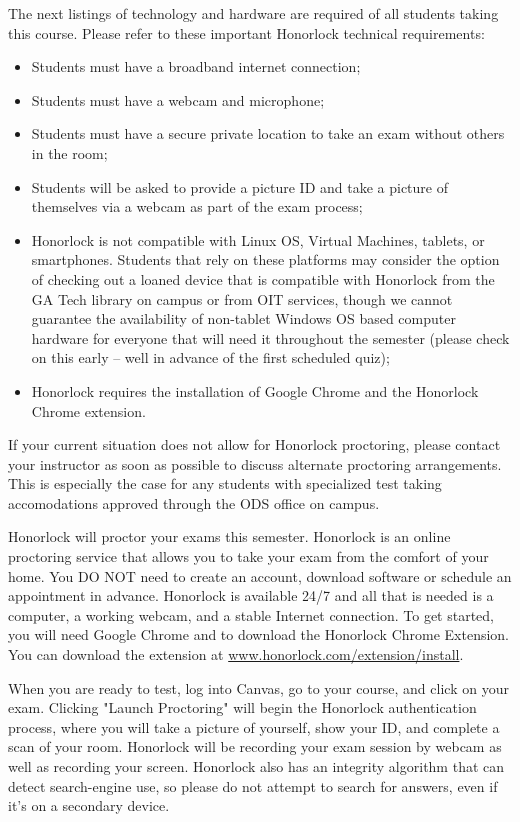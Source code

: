 \documentclass[11pt]{article}
\begin{document}
    The next listings of technology and hardware are required of all students taking this course. 
    Please refer to these important Honorlock technical requirements:
    \begin{itemize}
    \item Students must have a broadband internet connection; 
    \item Students must have a webcam and microphone; 
    \item Students must have a secure private location to take an exam without others in the room; 
    \item Students will be asked to provide a picture ID and take a picture of themselves via a webcam as 
          part of the exam process; 
    \item Honorlock is not compatible with Linux OS, Virtual Machines, tablets, or smartphones. 
          Students that rely on these platforms may consider the option of checking out a loaned device that is 
          compatible with Honorlock from the GA Tech library on campus or from OIT services, though we cannot 
          guarantee the availability of non-tablet Windows OS based computer hardware 
          for everyone that will need it throughout the semester (please check on this early -- well in 
          advance of the first scheduled quiz);
    \item Honorlock requires the installation of Google Chrome and the Honorlock Chrome extension. 
    \end{itemize} 
    If your current situation does not allow for Honorlock proctoring, please contact your instructor as 
    soon as possible to discuss alternate proctoring arrangements. This is especially the case for any students 
    with specialized test taking accomodations approved through the ODS office on campus.

    Honorlock will proctor your exams this semester. Honorlock is an online proctoring service that allows you 
    to take your exam from the comfort of your home. You DO NOT need to create an account, download software or 
    schedule an appointment in advance. Honorlock is available 24/7 and all that is needed is a computer, a 
    working webcam, and a stable Internet connection. 
    To get started, you will need Google Chrome and to download the Honorlock Chrome Extension. 
    You can download the extension at \url{www.honorlock.com/extension/install}. 
    
    When you are ready to test, log into Canvas, go to your course, and click on your exam. 
    Clicking "Launch Proctoring" will begin the Honorlock authentication process, where you 
    will take a picture of yourself, show your ID, and complete a scan of your room. Honorlock 
    will be recording your exam session by webcam as well as recording your screen. Honorlock 
    also has an integrity algorithm that can detect search-engine use, so please do not attempt 
    to search for answers, even if it's on a secondary device.
\end{document}
